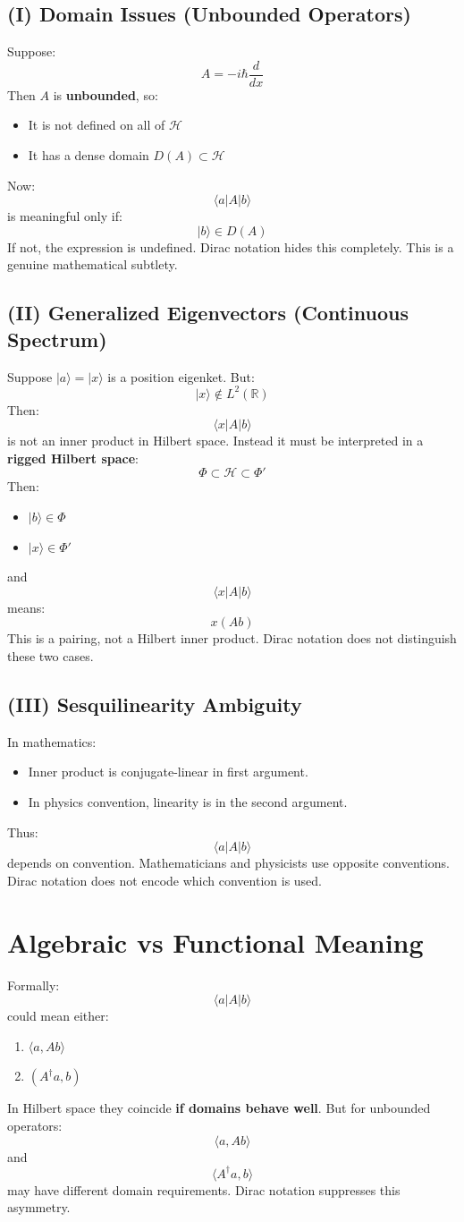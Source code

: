 \documentclass[12pt]{article}
\begin{document}
\subsection{(I) Domain Issues (Unbounded
Operators)}\label{i-domain-issues-unbounded-operators}
Suppose:
\[A = -i\hbar \frac{d}{dx}\]
Then \(A\) is \textbf{unbounded}, so:
\begin{itemize}
\item
  It is not defined on all of \(\mathcal H\)
\item
  It has a dense domain \(D(A)\subset \mathcal H\)
\end{itemize}
Now:
\[\langle a|A|b\rangle\]
is meaningful only if:
\[|b\rangle \in D(A)\]
If not, the expression is undefined.
Dirac notation hides this completely.
This is a genuine mathematical subtlety.
\subsection{(II) Generalized Eigenvectors (Continuous
Spectrum)}\label{ii-generalized-eigenvectors-continuous-spectrum}
Suppose \(|a\rangle = |x\rangle\) is a position eigenket.
But:
\[|x\rangle \notin L^2(\mathbb R)\]
Then:
\[\langle x|A|b\rangle\]
is not an inner product in Hilbert space.
Instead it must be interpreted in a \textbf{rigged Hilbert space}:
\[\Phi \subset \mathcal H \subset \Phi'\]
Then:
\begin{itemize}
\item
  \(|b\rangle \in \Phi\)
\item
  \(|x\rangle \in \Phi'\)
\end{itemize}
and
\[\langle x|A|b\rangle\]
means:
\[x(A b)\]
This is a pairing, not a Hilbert inner product.
Dirac notation does not distinguish these two cases.
\subsection{(III) Sesquilinearity
Ambiguity}\label{iii-sesquilinearity-ambiguity}
In mathematics:
\begin{itemize}
\item
  Inner product is conjugate-linear in first argument.
\item
  In physics convention, linearity is in the second argument.
\end{itemize}
Thus:
\[\langle a|A|b\rangle\]
depends on convention.
Mathematicians and physicists use opposite conventions.
Dirac notation does not encode which convention is used.
\section{ Algebraic vs Functional
Meaning}\label{algebraic-vs-functional-meaning}
Formally:
\[\langle a|A|b\rangle\]
could mean either:
\begin{enumerate}
\item
  \(\langle a, A b\rangle\)
\item
  \((A^\dagger a, b)\)
\end{enumerate}
In Hilbert space they coincide \textbf{if domains behave well}.
But for unbounded operators:
\[\langle a, A b\rangle\]
and
\[\langle A^\dagger a, b\rangle\]
may have different domain requirements.
Dirac notation suppresses this asymmetry.
\end{document}
